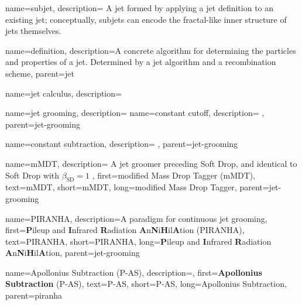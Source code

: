 {
  name=subjet,
  description={
      A jet formed by applying a jet definition to an existing jet;
      conceptually, subjets can encode the fractal-like inner structure of jets themselves.
  }
}



{
    name=definition,
    description={A concrete algorithm for determining the particles and properties of a jet.
    Determined by a jet algorithm and a recombination scheme},
    parent=jet
}



{
  name=jet calculus,
  description={}
}



{
  name=jet grooming,
  description={}
}
    {
        name=constant cutoff,
        description={
        },
        parent=jet-grooming
    }

    {
        name=constant subtraction,
        description={
        },
        parent=jet-grooming
    }

    {
        name=mMDT,
        description={
            A jet groomer preceding Soft Drop, and identical to Soft Drop with \(\beta_\text{SD}=1\)
       },
        first={modified Mass Drop Tagger (mMDT)},
        text={mMDT},
        short={mMDT},
        long={modified Mass Drop Tagger},
        parent=jet-grooming
    }


    {
        name=\textsc{PIRANHA},
        description={A paradigm for continuous jet grooming},
        first={\textbf{P}ileup and \textbf{I}nfrared \textbf{R}adiation \textbf{A}n\textbf{N}i\textbf{H}il\textbf{A}tion (\textsc{PIRANHA})},
        text={\textsc{PIRANHA}},
        short={\textsc{PIRANHA}},
        long={\textbf{P}ileup and \textbf{I}nfrared \textbf{R}adiation \textbf{A}n\textbf{N}i\textbf{H}il\textbf{A}tion},
        parent=jet-grooming
    }


    {
        name=Apollonius Subtraction (P-AS),
        description={},
        first={\textbf{Apollonius Subtraction} (P-AS)},
        text={P-AS},
        short={P-AS},
        long={Apollonius Subtraction},
        parent=piranha
    }

